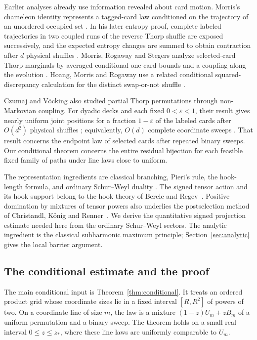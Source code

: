 Earlier analyses already use information revealed about card motion.
Morris's chameleon identity represents a tagged-card law conditioned on
the trajectory of an unordered occupied set
\cite[Section~4, Lemma~3]{Morris2008}. In his later entropy proof,
complete labeled trajectories in two coupled runs of the reverse Thorp shuffle are
exposed successively, and the expected entropy changes are summed to
obtain contraction after \(d\) physical shuffles
\cite[Section~4, proof of Lemma~7]{Morris2013}.
Morris, Rogaway and Stegers analyze selected-card Thorp marginals by
averaged conditional one-card bounds and a coupling along the evolution
\cite[Section~3 and Appendix~A, Lemma~2]{mrs}. Hoang, Morris and Rogaway
use a related conditional squared-discrepancy calculation for the
distinct swap-or-not shuffle
\cite[Section~3, proof of Theorem~3 and Lemma~4]{hmr2014}.

Czumaj and V\"ocking also studied partial Thorp permutations through
non-Markovian coupling. For dyadic decks and each fixed
\(0<\varepsilon<1\), their result gives nearly uniform joint positions
for a fraction \(1-\varepsilon\) of the labeled cards after \(O(d^2)\) physical shuffles
\cite{CzumajVocking2014}; equivalently, \(O(d)\) complete coordinate sweeps
\cite[Section~1.5]{Czumaj2015}. That result concerns the endpoint law of
selected cards after repeated binary sweeps. Our conditional theorem
concerns the entire residual bijection for each feasible fixed family
of paths under line laws close to uniform.

The representation ingredients are classical branching, Pieri's rule,
the hook-length formula, and ordinary Schur--Weyl duality
\cite{Sagan2001,Stanley1999}. The signed tensor action
and its hook support belong to the hook theory of Berele and
Regev~\cite{BereleRegev1983}. Positive domination by mixtures of tensor
powers also underlies the postselection method of Christandl, K\"onig and
Renner~\cite{ChristandlKonigRenner2009}. We derive the quantitative signed
projection estimate needed here from the ordinary Schur--Weyl sectors.
The analytic ingredient is the classical subharmonic maximum principle;
Section~\ref{sec:analytic} gives the local barrier argument.

\subsection{The conditional estimate and the proof}

The main conditional input is Theorem~\ref{thm:conditional}. It treats an
ordered product grid whose coordinate sizes lie in a fixed interval
\([R,R^2]\) of powers of two. On a coordinate line of size \(m\), the law
is a mixture \((1-z)U_m+zB_m\) of a uniform permutation and a binary
sweep. The theorem holds on a small real interval \(0\le z\le z_*\),
where these line laws are uniformly comparable to \(U_m\).

